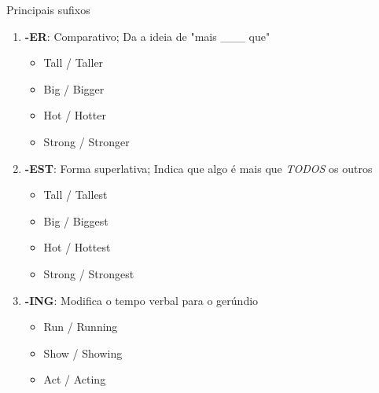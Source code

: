\documentclass[compress,mathserif,xcolor=table]{beamer}
\begin{document}

\begin{frame}{Principais sufixos}

\begin{enumerate}
    \item \textbf{-ER}: Comparativo; Da a ideia de "mais \_\_\_ que"
    \begin{itemize}
        \item Tall / Taller
        \item Big / Bigger
        \item Hot / Hotter
        \item Strong / Stronger
    \end{itemize}
    \vspace{0.75cm}
    \item \textbf{-EST}: Forma superlativa; Indica que algo é mais que \textit{TODOS} os outros
    \begin{itemize}
        \item Tall / Tallest
        \item Big / Biggest
        \item Hot / Hottest
        \item Strong / Strongest
    \end{itemize}
    \vspace{0.75cm}
    \item \textbf{-ING}: Modifica o tempo verbal para o gerúndio
    \begin{itemize}
        \item Run / Running
        \item Show / Showing
        \item Act / Acting
    \end{itemize}
\end{enumerate}
\end{frame}

\end{document}
